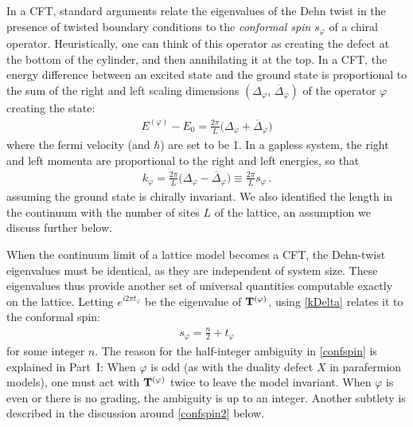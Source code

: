 In a CFT, standard arguments relate the eigenvalues of the Dehn twist in the presence of twisted boundary conditions to the {\em conformal spin} $s_\varphi$ of a chiral operator.
Heuristically, one can think of this operator as creating the defect at the bottom of the cylinder, and then annihilating it at the top. In a CFT,  the energy difference between an excited state and the ground state is proportional to the sum of the right and left scaling dimensions $(\Delta_\varphi,\,\overline{\Delta}_\varphi)$ of the operator $\varphi$ creating the state: 
\begin{align}
E^{(\varphi)} - E_0 = \frac{2\pi}{L}\Big( \Delta_\varphi +\overline{\Delta}_\varphi\Big)  
\end{align}
where the fermi velocity (and $\hbar$) are set to be 1. 
In a gapless system, the right and left momenta are proportional to the right and left energies, so that 
\begin{align}
k_\varphi = \frac{2\pi}{L}\Big( \Delta_\varphi - \overline{\Delta}_\varphi\Big) \equiv \frac{2\pi}{L} s_\varphi  \,.
\label{kDelta}
\end{align}
assuming the ground state is chirally invariant.  We also identified the length in the continuum with the number of sites $L$ of the lattice, an assumption we discuss further below. 

When the continuum limit of a lattice model becomes a CFT, the Dehn-twist eigenvalues must be identical, as they are independent of system size. These eigenvalues thus provide another set of universal quantities computable exactly on the lattice. Letting $e^{i2\pi t_\varphi}$ be the eigenvalue of ${\mathbf{T}}^{(\varphi)}$, using \eqref{kDelta} relates it to the conformal spin:
\begin{align}
s_\varphi = \frac{n}{2} + t_\varphi
\label{confspin}
\end{align}
for some integer $n$.
The reason for the half-integer ambiguity in \eqref{confspin} is explained in Part~I: When $\varphi$ is odd (as with the duality defect $X$ in parafermion models), one must act with ${\mathbf{T}}^{(\varphi)}$ twice to leave the model invariant. When $\varphi$ is even or there is no grading, the ambiguity is up to an integer. Another subtlety is described in the discussion around \eqref{confspin2} below. 

